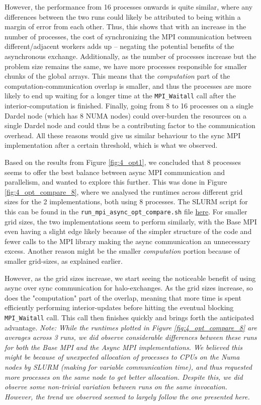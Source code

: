 \documentclass[a4paper,10pt]{article}
\begin{document}
\begin{multicols}{2}
However, the performance from 16 processes onwards is quite similar, where any differences between the two runs could likely be attributed to being within a margin of error from each other. Thus, this shows that with an increase in the number of processes, the cost of synchronizing the MPI communication between different/adjacent workers adds up -- negating the potential benefits of the asynchronous exchange. Additionally, as the number of processes increase but the problem size remains the same, we have more processes responsible for smaller chunks of the global arrays. This means that the \textit{computation} part of the computation-communication overlap is smaller, and thus the processes are more likely to end up waiting for a longer time at the \verb|MPI_Waitall| call after the interior-computation is finished. Finally, going from 8 to 16 processes on a single Dardel node (which has 8 NUMA nodes) could over-burden the resources on a single Dardel node and could thus be a contributing factor to the communication overhead. All these reasons would give us similar behaviour to the sync MPI implementation after a certain threshold, which is what we observed.

Based on the results from Figure \ref{fig:4_opt1}, we concluded that 8 processes seems to offer the best balance between async MPI communication and parallelism, and wanted to explore this further. This was done in Figure \ref{fig:4_opt_compare_8}, where we analysed the runtimes across different grid sizes for the 2 implementations, both using 8 processes. The SLURM script for this can be found in the \verb|run_mpi_async_opt_compare.sh| file \href{https://github.com/paulmyr/DD2356-MethodsHPC/blob/master/5_project/4_opt/run_mpi_async_opt_compare.sh}{here}. For smaller grid sizes, the two implementations seem to perform similarly, with the Base MPI even having a slight edge likely because of the simpler structure of the code and fewer calls to the MPI library making the async communication an unnecessary excess. Another reason might be the smaller \textit{computation} portion because of smaller grid-sizes, as explained earlier.

However, as the grid sizes increase, we start seeing the noticeable benefit of using async over sync communication for halo-exchanges. As the grid sizes increase, so does the "computation" part of the overlap, meaning that more time is spent efficiently performing interior-updates before hitting the eventual blocking \verb|MPI_Waitall| call. This call then finishes quickly and brings forth the anticipated advantage.
\textit{Note: While the runtimes plotted in Figure \ref{fig:4_opt_compare_8} are averages across 3 runs, we did observe considerable differences between these runs for both the Base MPI and the Async MPI implementations. We believed this might be because of unexpected allocation of processes to CPUs on the Numa nodes by SLURM (making for variable communication time), and thus requested more processes on the same node to get better allocation. Despite this, we did observe some non-trivial variation between runs on the same invocation. However, the trend we observed seemed to largely follow the one presented here.}


\end{multicols}
\end{document}

